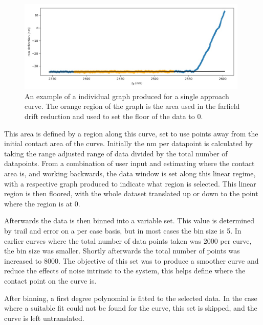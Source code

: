 \begin{figure}[h!]     %
        \begin{center}
          \includegraphics[width=110mm]{chapter4/farfielddrift.jpg}
\end{center}
\caption{An example of a individual graph produced for a single approach curve. The orange region of the graph is the area used in the farfield drift reduction and used to set the floor of the data to 0.}
\label{fig:farfielddrift}                 %
\end{figure}


This area is defined by a region along this curve, set to use points away from the initial contact area of the curve. Initially the nm per datapoint is calculated by taking the range adjusted range of data divided by the total number of datapoints. From a combination of user input and estimating where the contact area is, and working backwards, the data window is set along this linear regime, with a respective graph produced to indicate what region is selected. This linear region is then floored, with the whole dataset translated up or down to the point where the region is at 0.

Afterwards the data is then binned into a variable set. This value is determined by trail and error on a per case basis, but in most cases the bin size is 5. In earlier curves where the total number of data points taken was 2000 per curve, the bin size was smaller. Shortly afterwards the total number of points was increased to 8000. The objective of this set was to produce a smoother curve and reduce the effects of noise intrinsic to the system, this helps define where the contact point on the curve is.

After binning, a first degree polynomial is fitted to the selected data. In the case where a suitable fit could not be found for the curve, this set is skipped, and the curve is left untranslated.

